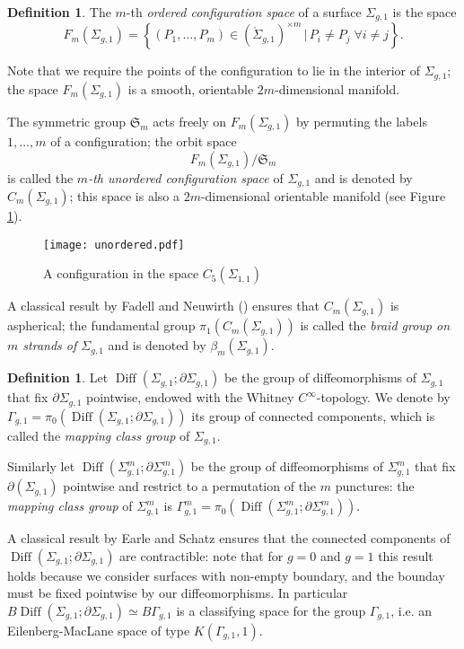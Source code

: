 \documentclass{amsart}
\theoremstyle{plain}
\theoremstyle{definition}
\newtheorem{defn}[thm]  {Definition}
\newcommand{\sgm}{\Sigma_{g,1}^m}
\newcommand{\sg}{\Sigma_{g,1}}
\renewcommand{\gg}{\Gamma_{g,1}}
\newcommand{\ggm}{\gg^m}
\newcommand{\bms}{\beta_{m}(\sg)}
\newcommand{\pa}[1]{\left(#1\right)}
\newcommand{\set}[1]{\left\{#1\right\}}
\DeclareMathOperator{\Diff}{Diff}
\begin{document}
\begin{defn}
\label{defn:cms}
 The $m$-th \emph{ordered configuration space} of a surface $\sg$ is the space
\[
 F_m(\sg)=\set{(P_1,\dots,P_m) \in \pa{\mathring{\Sigma}_{g,1}}^{\times m}  \,|\,  P_i\neq P_j  \;\forall i\neq j}.
\]

 Note that we require the points of the configuration to lie in the interior of $\sg$; the space
 $F_m(\sg)$ is a smooth, orientable $2m$-dimensional manifold.
 
 The symmetric group $\mathfrak{S}_m$ acts freely on $F_m(\sg)$ by permuting the labels $1,\dots,m$ of a configuration;
 the orbit space
 \[
 F_m(\sg)/\mathfrak{S}_m
 \]
 is called the \emph{$m$-th unordered configuration space}
 of $\sg$ and is denoted by $C_m(\sg)$; this space is also a $2m$-dimensional orientable manifold
 (see Figure \ref{fig:unordered}).
 
\end{defn}

\begin{figure}[ht]\centering
\texttt{[image: unordered.pdf]}
\caption{A configuration in the space $C_5(\Sigma_{1,1})$}
\label{fig:unordered}
\end{figure}

A classical result by Fadell and Neuwirth (\cite{FadellNeuwirth}) ensures
that $C_m(\sg)$ is aspherical; the fundamental group $\pi_1(C_m(\sg))$ is
called the \emph{braid group on $m$ strands of $\sg$} and is denoted by $\bms$.

\begin{defn}
 \label{def:mcg}
 Let $\Diff(\sg;\partial\sg)$ be the group of diffeomorphisms of $\sg$ that fix $\partial\sg$ pointwise,
 endowed with the Whitney $C^{\infty}$-topology. We denote by $\gg=\pi_0(\Diff(\sg;\partial\sg))$ its group of connected
 components, which is called the \emph{mapping class group} of $\sg$.
 
 Similarly let $\Diff(\sgm;\partial\sgm)$ be the group of diffeomorphisms of $\sgm$ that fix $\partial(\sg)$
 pointwise and restrict to a permutation of the $m$ punctures: the \emph{mapping class group} of $\sgm$ is
 $\ggm=\pi_0(\Diff(\sgm;\partial\sgm))$.
 \end{defn}
 A classical result by Earle and Schatz \cite{EarleSchatz} ensures that the connected components
 of $\Diff(\sg;\partial\sg)$ are contractible: note that for $g=0$ and $g=1$ this result holds
 because we consider surfaces with non-empty boundary, and the bounday must be fixed pointwise
 by our diffeomorphisms. In particular $B\Diff(\sg;\partial\sg)\simeq B\gg$ is
 a classifying space for
 the group $\gg$, i.e. an Eilenberg-MacLane space of type $K(\gg,1)$.
 
\end{document}
